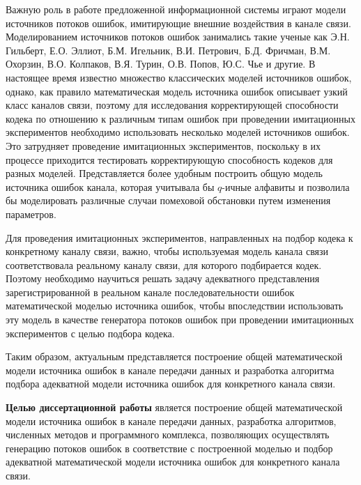 \documentclass[twoside,12pt]{article}
\begin{document}
Важную роль в работе предложенной информационной системы играют модели источников потоков ошибок, имитирующие внешние воздействия в канале связи. Моделированием источников потоков ошибок занимались такие ученые как Э.Н. Гильберт, Е.О. Эллиот, Б.М. Игельник, В.И. Петрович, Б.Д. Фричман, В.М. Охорзин, В.О. Колпаков, В.Я. Турин, О.В. Попов, Ю.С. Чье и другие. В настоящее время известно множество классических моделей источников ошибок, однако, как правило математическая модель источника ошибок описывает узкий класс каналов связи, поэтому для исследования корректирующей способности кодека по отношению к различным типам ошибок при проведении имитационных экспериментов необходимо использовать несколько моделей источников ошибок. Это затрудняет проведение имитационных экспериментов, поскольку в их процессе приходится тестировать корректирующую способность кодеков для разных моделей. Представляется более удобным построить общую модель источника ошибок канала, которая учитывала бы $q$-ичные алфавиты и позволила бы моделировать различные случаи помеховой обстановки путем изменения параметров.

Для проведения имитационных экспериментов, направленных на подбор кодека к конкретному каналу связи, важно, чтобы используемая модель канала связи соответствовала реальному каналу связи, для которого подбирается кодек. Поэтому необходимо научиться решать задачу адекватного представления зарегистрированной в реальном канале последовательности ошибок математической моделью источника ошибок, чтобы впоследствии использовать эту модель в качестве генератора потоков ошибок при проведении имитационных экспериментов с целью подбора кодека.

Таким образом, актуальным представляется построение общей математической модели источника ошибок в канале передачи данных и разработка алгоритма подбора адекватной модели источника ошибок для конкретного канала связи.

\textbf{Целью диссертационной работы} является построение общей математической модели источника ошибок в канале передачи данных, разработка алгоритмов, численных методов и программного комплекса, позволяющих осуществлять генерацию потоков ошибок в соответствие с построенной моделью и подбор адекватной математической модели источника ошибок для конкретного канала связи.
\end{document}
